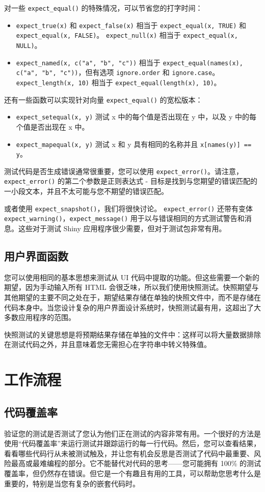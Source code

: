 对一些 \verb|expect_equal()| 的特殊情况，可以节省您的打字时间：
\begin{itemize}
    \item \verb|expect_true(x)| 和 \verb|expect_false(x)| 相当于 \verb|expect_equal(x, TRUE)| 和 \verb|expect_equal(x, FALSE)|。 \verb|expect_null(x)| 相当于 \verb|expect_equal(x, NULL)|。
    \item \verb|expect_named(x, c("a", "b", "c"))| 相当于 \verb|expect_equal(names(x), c("a", "b", "c"))|，但有选项 \verb|ignore.order| 和 \verb|ignore.case|。 \verb|expect_length(x, 10)| 相当于 \verb|expect_equal(length(x), 10)|。
\end{itemize}

还有一些函数可以实现针对向量 \verb|expect_equal()| 的宽松版本：
\begin{itemize}
    \item \verb|expect_setequal(x, y)| 测试 x 中的每个值是否出现在 y 中，以及 y 中的每个值是否出现在 x 中。
    \item \verb|expect_mapequal(x, y)| 测试 x 和 y 具有相同的名称并且 \verb|x[names(y)] == y|。
\end{itemize}

测试代码是否生成错误通常很重要，您可以使用 \verb|expect_error()|。请注意，\verb|expect_error()| 的第二个参数是正则表达式 - 目标是找到与您期望的错误匹配的一小段文本，并且不太可能与您不期望的错误匹配。

或者使用 \verb|expect_snapshot()|，我们将很快讨论。 \verb|expect_error()| 还带有变体 \verb|expect_warning()|，\verb|expect_message()| 用于以与错误相同的方式测试警告和消息。这些对于测试 Shiny 应用程序很少需要，但对于测试包非常有用。
\subsection{用户界面函数}
您可以使用相同的基本思想来测试从 UI 代码中提取的功能。但这些需要一个新的期望，因为手动输入所有 HTML 会很乏味，所以我们使用快照测试。快照期望与其他期望的主要不同之处在于，期望结果存储在单独的快照文件中，而不是存储在代码本身中。当您设计复杂的用户界面设计系统时，快照测试最有用，这超出了大多数应用程序的范围。

快照测试的关键思想是将预期结果存储在单独的文件中：这样可以将大量数据排除在测试代码之外，并且意味着您无需担心在字符串中转义特殊值。
\section{工作流程}
\subsection{代码覆盖率}
验证您的测试是否测试了您认为他们正在测试的内容非常有用。一个很好的方法是使用“代码覆盖率”来运行测试并跟踪运行的每一行代码。然后，您可以查看结果，看看哪些代码行从未被测试触及，并让您有机会反思是否测试了代码中最重要、风险最高或最难编程的部分。它不能替代对代码的思考——您可能拥有 100\% 的测试覆盖率，但仍然存在错误。但它是一个有趣且有用的工具，可以帮助您思考什么是重要的，特别是当您有复杂的嵌套代码时。
